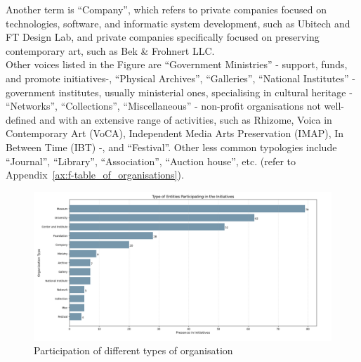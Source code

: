 Another term is ``Company'', which refers to private companies focused on technologies, software, and informatic system development, such as Ubitech and FT Design Lab, and private companies specifically focused on preserving contemporary art, such as Bek \& Frohnert LLC.\\
Other voices listed in the Figure are ``Government Ministries'' - support, funds, and promote initiatives-, ``Physical Archives'', ``Galleries'', ``National Institutes'' - government institutes, usually ministerial ones, specialising in cultural heritage - ``Networks'', ``Collections'', ``Miscellaneous'' - non-profit organisations not well-defined and with an extensive range of activities, such as Rhizome, Voica in Contemporary Art (VoCA), Independent Media Arts Preservation (IMAP), In Between Time (IBT) -, and ``Festival''. Other less common typologies include ``Journal'', ``Library'', ``Association'', ``Auction house'', etc. (refer to Appendix~\ref{ax:f-table_of_organisations}).

\begin{figure}[!h]
    \centering
    \includegraphics[width=\textwidth]{chapters/1-state_of_the_art/image/plot01-orgtypes.png}
    \caption{Participation of different types of organisation}
    \label{fig:c1-org_type}
\end{figure}


